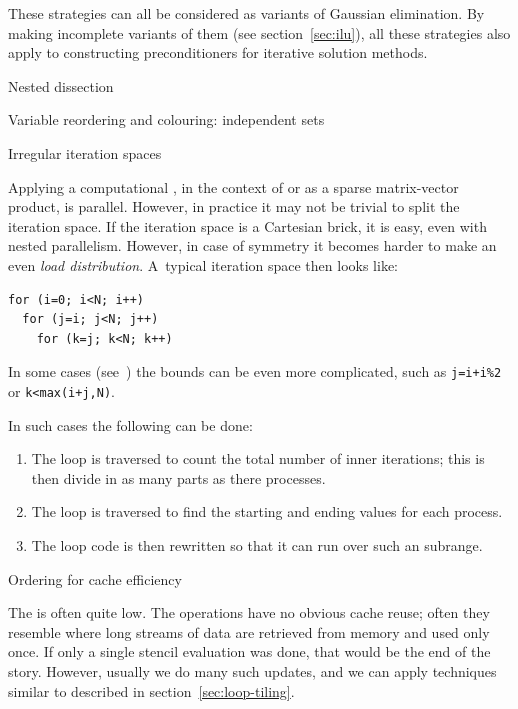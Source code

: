 These strategies can all be considered as variants of Gaussian elimination.
By making incomplete variants of them (see section~\ref{sec:ilu}),
all these strategies also apply to constructing preconditioners
for iterative solution methods.

 {Nested dissection}
\label{sec:dissection}


 {Variable reordering and colouring: independent sets}
\label{sec:redblackgreen}


 {Irregular iteration spaces}
\label{sec:iterationspace}

Applying a computational , in the context of
%
or as a sparse matrix-vector product, is parallel. However, in
practice it may not be trivial to split the iteration space. If the
iteration space is a Cartesian brick, it is easy, even with nested
parallelism. However, in case of symmetry it becomes harder to make an
even
%
\emph{load distribution}.
%
A~typical iteration space then looks like:
\begin{verbatim}
for (i=0; i<N; i++)
  for (j=i; j<N; j++)
    for (k=j; k<N; k++)
\end{verbatim}
In some cases (see~\cite{Briggs:CMB}) the bounds can be even more
complicated, such as \verb/j=i+i%2/ or \verb/k<max(i+j,N)/.

In such cases the following can be done:
\begin{enumerate}
\item The loop is traversed to count the total number of inner
  iterations; this is then divide in as many parts as there processes.
\item The loop is traversed to find the starting and ending 
  values for each process.
\item The loop code is then rewritten so that it can run over such an
   subrange.
\end{enumerate}

 {Ordering for cache efficiency}
\label{sec:fd-oblivious}

The  is often quite
low. The operations have no obvious cache reuse; often they resemble
%
 where long streams of data are retrieved
from memory and used only once. If only a single stencil evaluation
was done, that would be the end of the story. However, usually we do
many such updates, and we can apply techniques similar to
%
 described in section~\ref{sec:loop-tiling}.

